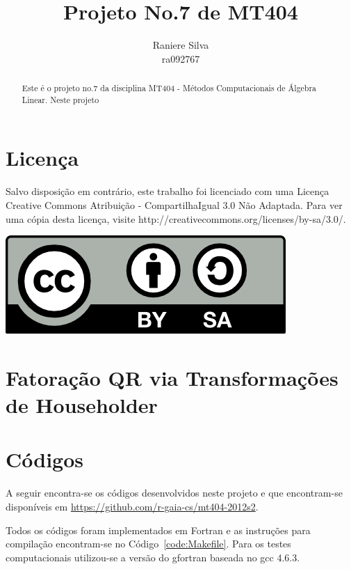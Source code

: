 \documentclass[12pt,a4paper]{article}
\begin{document}
\title{Projeto No.7 de MT404}
\author{Raniere Silva \\ ra092767}
\maketitle
\begin{abstract}
    Este \'{e} o projeto no.7 da disciplina MT404 - M\'{e}todos Computacionais
    de \'{A}lgebra Linear. Neste projeto 
\end{abstract}
\tableofcontents
\lstlistoflistings
\section*{Licen\c{c}a}
Salvo disposi\c{c}\~{a}o em contr\'{a}rio, este trabalho foi licenciado com uma
Licen\c{c}a Creative Commons Atribui\c{c}\~{a}o - CompartilhaIgual 3.0 N\~{a}o
Adaptada. Para ver uma c\'{o}pia desta licen\c{c}a, visite
http://creativecommons.org/licenses/by-sa/3.0/.
\begin{center}
    \includegraphics{../figuras/cc-by-sa.png}
\end{center}
\newpage
\section{Fatoração QR via Transformações de Householder}
\section{C\'{o}digos}
A seguir encontra-se os c\'{o}digos desenvolvidos neste projeto e que
encontram-se disponíveis em \url{https://github.com/r-gaia-cs/mt404-2012s2}.

Todos os c\'{o}digos foram implementados em Fortran e as instruções para
compilação encontram-se no Código~\ref{code:Makefile}. Para os testes
computacionais utilizou-se a versão do gfortran baseada no gcc 4.6.3.





\end{document}
